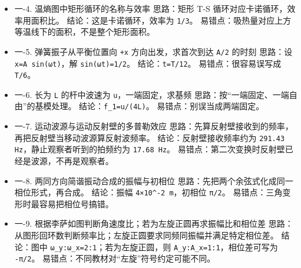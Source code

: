 \documentclass[12pt,a4paper]{ctexart}
\begin{document}
\begin{itemize}

\item 一-4. 温熵图中矩形循环的名称与效率 思路：矩形 T-S 循环对应卡诺循环，效率用面积比。 结论：这是卡诺循环，效率为 \texttt{1/3}。 易错点：吸热量对应上方等温线下的面积，不是整个矩形面积。

\end{itemize}

\begin{itemize}

\item 一-5. 弹簧振子从平衡位置向 \texttt{+x} 方向出发，求首次到达 \texttt{A/2} 的时刻 思路：设 \texttt{x=A sin(ωt)}，解 \texttt{sin(ωt)=1/2}。 结论：\texttt{t=T/12}。 易错点：很容易误写成 \texttt{T/6}。

\end{itemize}

\begin{itemize}

\item 一-6. 长为 \texttt{L} 的杆中波速为 \texttt{u}，一端固定，求基频 思路：按“一端固定、一端自由”的基模处理。 结论：\texttt{f\_1=u/(4L)}。 易错点：别误当成两端固定。

\end{itemize}

\begin{itemize}

\item 一-7. 运动波源与运动反射壁的多普勒效应 思路：先算反射壁接收到的频率，再把反射壁当移动波源算反射波频率。 结论：反射壁接收频率约为 \texttt{291.43 Hz}，静止观察者听到的拍频约为 \texttt{17.68 Hz}。 易错点：第二次变换时反射壁已经是波源，不再是观察者。

\end{itemize}

\begin{itemize}

\item 一-8. 两同方向简谐振动合成的振幅与初相位 思路：先把两个余弦式化成同一相位形式，再合成。 结论：振幅 \texttt{4×10\textasciicircum{}-2 m}，初相位 \texttt{π/2}。 易错点：三角变形时最容易把相位号搞错。

\end{itemize}

\begin{itemize}

\item 一-9. 根据李萨如图判断角速度比；若为左旋正圆再求振幅比和相位差 思路：从图形回环数判断频率比；左旋正圆要求同频同振幅并满足特定相位差。 结论：图中 \texttt{ω\_y:ω\_x=2:1}；若为左旋正圆，则 \texttt{A\_y:A\_x=1:1}，相位差可写为 \texttt{-π/2}。 易错点：不同教材对“左旋”符号约定可能不同。

\end{itemize}
\end{document}
